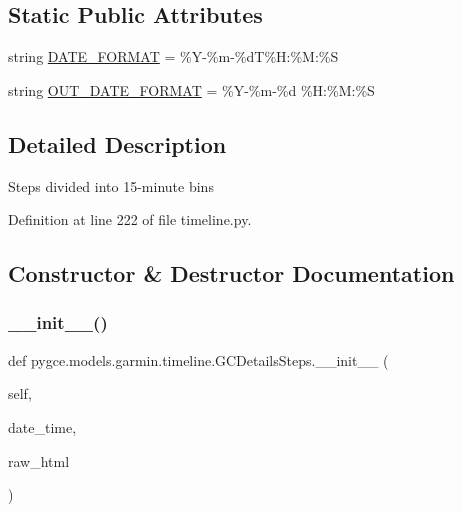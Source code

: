 \subsection*{Static Public Attributes}
\begin{DoxyCompactItemize}
\item 
string \hyperlink{classpygce_1_1models_1_1garmin_1_1timeline_1_1_g_c_details_steps_a8d17dfb2c71940bf93eaad067530b647}{D\+A\+T\+E\+\_\+\+F\+O\+R\+M\+AT} = \textquotesingle{}\%Y-\/\%m-\/\%dT\%H\+:\%M\+:\%S\textquotesingle{}
\item 
string \hyperlink{classpygce_1_1models_1_1garmin_1_1timeline_1_1_g_c_details_steps_a3384eb72726712a30a3afa1456d93435}{O\+U\+T\+\_\+\+D\+A\+T\+E\+\_\+\+F\+O\+R\+M\+AT} = \textquotesingle{}\%Y-\/\%m-\/\%d \%H\+:\%M\+:\%S\textquotesingle{}
\end{DoxyCompactItemize}


\subsection{Detailed Description}
\begin{DoxyVerb}Steps divided into 15-minute bins\end{DoxyVerb}
 

Definition at line 222 of file timeline.\+py.



\subsection{Constructor \& Destructor Documentation}
\mbox{\label{classpygce_1_1models_1_1garmin_1_1timeline_1_1_g_c_details_steps_a5f7b833bf7f4a81d94f3f133d264824e}} 
\subsubsection{\texorpdfstring{\+\_\+\+\_\+init\+\_\+\+\_\+()}{\_\_init\_\_()}}
{\footnotesize\ttfamily def pygce.\+models.\+garmin.\+timeline.\+G\+C\+Details\+Steps.\+\_\+\+\_\+init\+\_\+\+\_\+ (\begin{DoxyParamCaption}\item[{}]{self,  }\item[{}]{date\+\_\+time,  }\item[{}]{raw\+\_\+html }\end{DoxyParamCaption})}



